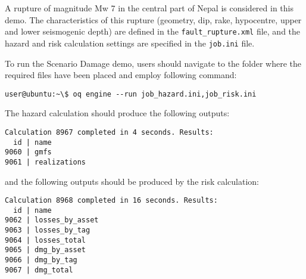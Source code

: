 A rupture of magnitude Mw 7 in the central part of Nepal is considered in this
demo. The characteristics of this rupture (geometry, dip, rake, hypocentre,
upper and lower seismogenic depth) are defined in the \verb+fault_rupture.xml+
file, and the hazard and risk calculation settings are specified in the
\verb+job.ini+ file.

To run the Scenario Damage demo, users should navigate to the folder where the
required files have been placed and employ following command:

\begin{verbatim}
user@ubuntu:~\$ oq engine --run job_hazard.ini,job_risk.ini
\end{verbatim}

The hazard calculation should produce the following outputs:

\begin{verbatim}
Calculation 8967 completed in 4 seconds. Results:
  id | name
9060 | gmfs
9061 | realizations
\end{verbatim}

and the following outputs should be produced by the risk calculation:

\begin{verbatim}
Calculation 8968 completed in 16 seconds. Results:
  id | name
9062 | losses_by_asset
9063 | losses_by_tag
9064 | losses_total
9065 | dmg_by_asset
9066 | dmg_by_tag
9067 | dmg_total
\end{verbatim}

